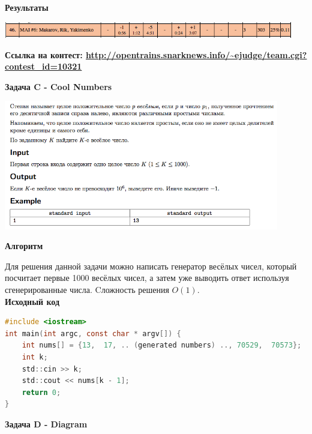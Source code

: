 \documentclass[a4paper,12pt]{article}
\begin{document}
\textbf{{\large Результаты}} \\
\begin{center}
\includegraphics[width=0.95\textwidth]{OC_Ukraine/result.png}\\ [1cm]
\end{center}

\textbf{{\large Ссылка на контест: \url{http://opentrains.snarknews.info/~ejudge/team.cgi?contest_id=10321}}}

\newpage
\textbf{{\large Задача C - Cool Numbers}}

\begin{center}
\includegraphics[width=0.9\textwidth]{OC_Ukraine/C.png}\\ [1cm]
\end{center}

\textbf{{\large Алгоритм}}

Для решения данной задачи можно написать генератор весёлых чисел, который посчитает первые 1000 весёлых чисел, а затем уже выводить ответ используя сгенерированные числа. Cложность решения $O(1)$. \\

\textbf{{\large Исходный код}} \\
\begin{lstlisting}[language=C]
#include <iostream>
int main(int argc, const char * argv[]) {
    int nums[] = {13,  17, .. (generated numbers) .., 70529,  70573};
    int k;
    std::cin >> k;
    std::cout << nums[k - 1];
    return 0;
}
\end{lstlisting}


\newpage
\textbf{{\large Задача D - Diagram}}
\end{document}
